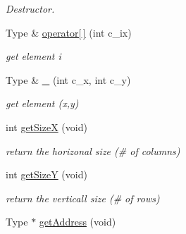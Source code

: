 \begin{DoxyCompactItemize}
\begin{DoxyCompactList}\small\item\em Destructor. \end{DoxyCompactList}\item 
Type \& \hyperlink{classArray_ab64d3faf9a308906538129bb30c6c214}{operator\mbox{[}$\,$\mbox{]}} (int c\+\_\+ix)
\begin{DoxyCompactList}\small\item\em get element i \end{DoxyCompactList}\item 
Type \& \hyperlink{classArray_a7ac413ecea1ef9e6912ac301d66cfe4e}{\+\_\+} (int c\+\_\+x, int c\+\_\+y)
\begin{DoxyCompactList}\small\item\em get element (x,y) \end{DoxyCompactList}\item 
int \hyperlink{classArray_a820344192c51e35ad883910386221f63}{get\+SizeX} (void)\hypertarget{classArray_a820344192c51e35ad883910386221f63}{}\label{classArray_a820344192c51e35ad883910386221f63}

\begin{DoxyCompactList}\small\item\em return the horizonal size (\# of columns) \end{DoxyCompactList}\item 
int \hyperlink{classArray_ac9885e1bcca8a05fadc5c45acbc4244b}{get\+SizeY} (void)\hypertarget{classArray_ac9885e1bcca8a05fadc5c45acbc4244b}{}\label{classArray_ac9885e1bcca8a05fadc5c45acbc4244b}

\begin{DoxyCompactList}\small\item\em return the verticall size (\# of rows) \end{DoxyCompactList}\item 
Type $\ast$ \hyperlink{classArray_a137d3275412d90f0430daed3f720e2e1}{get\+Address} (void)\hypertarget{classArray_a137d3275412d90f0430daed3f720e2e1}{}\label{classArray_a137d3275412d90f0430daed3f720e2e1}


\end{DoxyCompactItemize}
